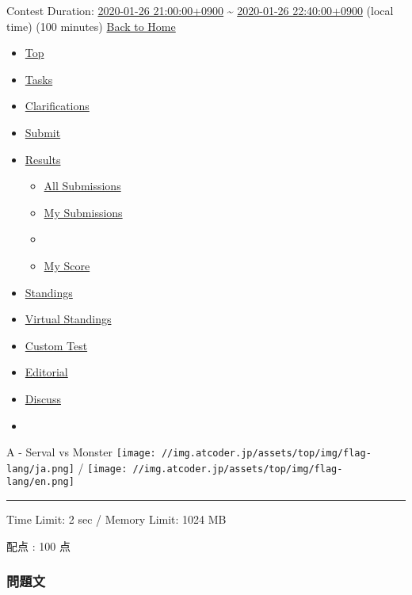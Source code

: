 {Contest Duration:
\href{http://www.timeanddate.com/worldclock/fixedtime.html?iso=20200126T2100\&p1=248}{2020-01-26
21:00:00+0900} \textasciitilde{}
\href{http://www.timeanddate.com/worldclock/fixedtime.html?iso=20200126T2240\&p1=248}{2020-01-26
22:40:00+0900} (local time) (100 minutes)} {\href{/home}{Back to Home}}

\begin{itemize}
\tightlist
\item
  \href{/contests/abc153}{Top}
\item
  \href{/contests/abc153/tasks}{Tasks}
\item
  \href{/contests/abc153/clarifications}{Clarifications}
\item
  \href{/contests/abc153/submit?taskScreenName=abc153_a}{Submit}
\item
  \protect\hyperlink{}{Results}

  \begin{itemize}
  \item
    \href{/contests/abc153/submissions}{All Submissions}
  \item
    \href{/contests/abc153/submissions/me}{My Submissions}
  \item
  \item
    \href{/contests/abc153/score}{My Score}
  \end{itemize}
\item
  \href{/contests/abc153/standings}{Standings}
\item
  \href{/contests/abc153/standings/virtual}{Virtual Standings}
\item
  \href{/contests/abc153/custom_test}{Custom Test}
\item
  \href{https://img.atcoder.jp/abc153/editorial.pdf}{Editorial}
\item
  \href{https://codeforces.com/blog/entry/73361}{Discuss}
\item
  \href{javascript:void(0)}{}
\end{itemize}

A - Serval vs Monster
\texttt{[image: //img.atcoder.jp/assets/top/img/flag-lang/ja.png]} /
\texttt{[image: //img.atcoder.jp/assets/top/img/flag-lang/en.png]}

\begin{center}\rule{0.5\linewidth}{\linethickness}\end{center}

Time Limit: 2 sec / Memory Limit: 1024 MB

配点 : 100 点

\subsubsection{問題文}

